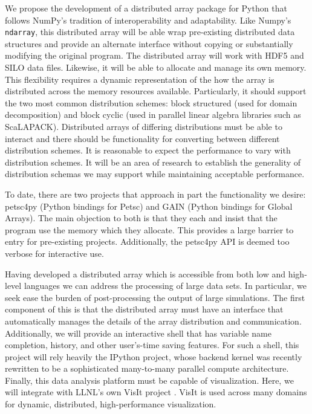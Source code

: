\documentclass[letterpaper,12pt]{article}
\begin{document}
We propose the development of a distributed array package for Python that follows NumPy's 
tradition of interoperability and adaptability.  Like Numpy's \texttt{ndarray}, this 
distributed array will be able wrap pre-existing distributed data structures and provide 
an alternate interface without copying or substantially modifying the original program.  
The distributed array will work with HDF5\cite{HDF5} and SILO data files.  Likewise, it 
will be able to allocate and manage its own memory.  This flexibility requires a dynamic 
representation of the how the array is distributed across the memory resources available.  
Particularly, it should support the two most common distribution schemes: block structured 
(used for domain decomposition) and block cyclic (used in parallel linear algebra libraries 
such as ScaLAPACK\cite{scalapack}).  Distributed arrays of differing distributions must be 
able to interact and there should be functionality for converting between different 
distribution schemes.  It is reasonable to expect the performance to vary with distribution 
schemes.  It will be an area of research to establish the generality of distribution 
schemas we may support while maintaining acceptable performance.

To date, there are two projects that approach in part the functionality we desire: 
petsc4py\cite{petsc4py-web-page} (Python bindings for Petsc\cite{petsc-user-ref}) 
and GAIN\cite{global-arrays-python} (Python bindings for Global Arrays\cite{global-arrays}).  
The main objection to both is that they each and insist that the program use the 
memory which they allocate.  This provides a large barrier to entry for pre-existing 
projects.  Additionally, the petsc4py API is deemed too verbose for interactive use.

Having developed a distributed array which is accessible from both low and high-level 
languages we can address the processing of large data sets.  In particular, we seek 
ease the burden of post-processing the output of large simulations. 
The first component of this is that the distributed array must have an interface that 
automatically manages the details of the array distribution and communication.  
Additionally, we will provide an interactive shell that has variable name completion, 
history, and other user's-time saving features.  For such a shell, this project will 
rely heavily the IPython project, whose backend kernel was recently rewritten to be a 
sophisticated many-to-many parallel compute architecture.  Finally, this data analysis 
platform must be capable of visualization.  Here, we will integrate with LLNL's own VisIt 
project \cite{needed}.  VisIt is used across many domains for dynamic, distributed, 
high-performance visualization.
\end{document}
